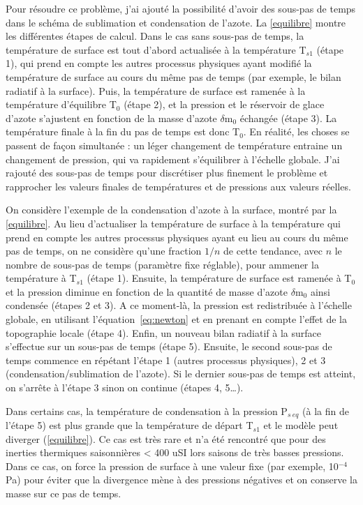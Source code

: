 Pour résoudre ce problème, j'ai ajouté la possibilité d’avoir des sous-pas de temps dans le schéma de sublimation et condensation de l’azote.  
La \autoref{equilibre} montre les différentes étapes de calcul. Dans le cas sans sous-pas de temps, la température de surface est tout d’abord actualisée à la température T$_{s1}$ (étape 1), qui prend en compte les autres processus physiques ayant modifié la température de surface au cours du même pas de temps (par exemple, le bilan radiatif à la surface). Puis, la température de surface est ramenée à la température d’équilibre T$_0$ (étape 2), et la pression et le réservoir de glace d’azote s’ajustent en fonction de la masse d’azote $\delta$m$_0$ échangée (étape 3). La température finale à la fin du pas de temps est donc T$_0$. 
En réalité, les choses se passent de façon simultanée : un léger changement de température entraine un changement de pression, qui va rapidement s’équilibrer à l’échelle globale. J'ai rajouté des sous-pas de temps pour discrétiser plus finement le problème et rapprocher les valeurs finales de températures et de pressions aux valeurs réelles. 

On considère l’exemple de la condensation d’azote à la surface, montré par la \autoref{equilibre}.
Au lieu d'actualiser la température de surface à la température qui prend en compte les autres processus physiques ayant eu lieu au cours du même pas de temps, on ne considère qu'une fraction $1/n$ de cette tendance, avec $n$ le nombre de sous-pas de temps (paramètre fixe réglable), pour ammener la température à T$_{s1}$ (étape 1). Ensuite, la température de surface est ramenée à T$_0$ et la pression diminue en fonction de la quantité de masse d’azote $\delta$m$_0$ ainsi condensée (étapes 2 et 3).
A ce moment-là, la pression est redistribuée à l’échelle globale, en utilisant l’équation~\ref{eq:newton} et en prenant en compte l’effet de la topographie locale (étape 4). Enfin, un nouveau bilan radiatif à la surface s’effectue sur un sous-pas de temps (étape 5). Ensuite, le second sous-pas de temps commence en répétant l’étape 1 (autres processus physiques), 2 et 3 (condensation/sublimation de l’azote). Si le dernier sous-pas de temps est atteint, on s’arrête à l’étape 3 sinon on continue (étapes 4, 5…). 


Dans certains cas, la température de condensation à la pression P$_{s~eq}$ (à la fin de l’étape 5) est plus grande que la température de départ T$_{s1}$ et le modèle peut diverger (\autoref{equilibre}). Ce cas est très rare et n’a été rencontré que pour des inerties thermiques saisonnières < 400 uSI lors saisons de très basses pressions. Dans ce cas, on force la pression de surface à une valeur fixe (par exemple, 10$^{-4}$ Pa) pour éviter que la divergence mène à des pressions négatives et on conserve la masse sur ce pas de temps.  

